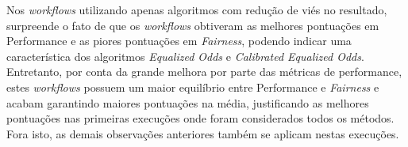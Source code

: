 \documentclass[portugues]{ic-tese}
\begin{document}
Nos \textit{workflows} utilizando apenas algoritmos com redução de viés no resultado, surpreende o fato de que os \textit{workflows} obtiveram as melhores pontuações em Performance e as piores pontuações em \textit{Fairness}, podendo indicar uma característica dos algoritmos \textit{Equalized Odds} e \textit{Calibrated Equalized Odds}. Entretanto, por conta da grande melhora por parte das métricas de performance, estes \textit{workflows} possuem um maior equilíbrio entre Performance e \textit{Fairness} e acabam garantindo maiores pontuações na média, justificando as melhores pontuações nas primeiras execuções onde foram considerados todos os métodos. Fora isto, as demais observações anteriores também se aplicam nestas execuções.

\begin{table}[H]
\begin{center}
  \caption{Melhores opções escolhidas pelo modelo MAPE-K \\ Apenas sem redução de viés - 50\% Performance/50\% Fairness}
\label{tbl:ScoreMAPEKNoproc5050}
\end{center}
\end{table}
\end{document}
